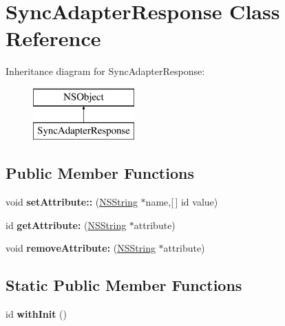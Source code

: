 \hypertarget{interface_sync_adapter_response}{
\section{\-Sync\-Adapter\-Response \-Class \-Reference}
\label{interface_sync_adapter_response}
}
\-Inheritance diagram for \-Sync\-Adapter\-Response\-:\begin{figure}[H]
\begin{center}
\leavevmode
\includegraphics[height=2.000000cm]{interface_sync_adapter_response}
\end{center}
\end{figure}
\subsection*{\-Public \-Member \-Functions}
\begin{DoxyCompactItemize}
\item 
\hypertarget{interface_sync_adapter_response_a8510f0172977c9a67fe0eb998fc0e4c5}{
void {\bfseries set\-Attribute\-::} (\hyperlink{class_n_s_string}{\-N\-S\-String} $\ast$name,\mbox{[}$\,$\mbox{]} id value)}
\label{interface_sync_adapter_response_a8510f0172977c9a67fe0eb998fc0e4c5}

\item 
\hypertarget{interface_sync_adapter_response_a51d106160c258a2f7a1fdc8ca8b7ed59}{
id {\bfseries get\-Attribute\-:} (\hyperlink{class_n_s_string}{\-N\-S\-String} $\ast$attribute)}
\label{interface_sync_adapter_response_a51d106160c258a2f7a1fdc8ca8b7ed59}

\item 
\hypertarget{interface_sync_adapter_response_ac48df0a7d4900cebfcb23ea85804d660}{
void {\bfseries remove\-Attribute\-:} (\hyperlink{class_n_s_string}{\-N\-S\-String} $\ast$attribute)}
\label{interface_sync_adapter_response_ac48df0a7d4900cebfcb23ea85804d660}

\end{DoxyCompactItemize}
\subsection*{\-Static \-Public \-Member \-Functions}
\begin{DoxyCompactItemize}
\item 
\hypertarget{interface_sync_adapter_response_a7eaee32c643ae6cd47819514a8b315ee}{
id {\bfseries with\-Init} ()}
\label{interface_sync_adapter_response_a7eaee32c643ae6cd47819514a8b315ee}

\end{DoxyCompactItemize}
